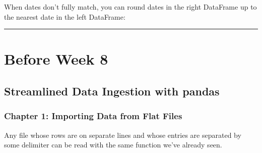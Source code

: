 \documentclass[letterpaper,10pt,english]{sphinxmanual}
\begin{document}
\begin{sphinxVerbatim}[commandchars=\\\{\}]
      
             
     
    
            
\end{sphinxVerbatim}

When dates don’t fully match, you can round dates in the right DataFrame up to the nearest date in the left DataFrame:

\begin{sphinxVerbatim}[commandchars=\\\{\}]
     
\end{sphinxVerbatim}


\bigskip\hrule\bigskip



\section{Before Week 8}
\label{\detokenize{big-cheat-sheet:before-week-8}}

\subsection{Streamlined Data Ingestion with pandas}
\label{\detokenize{big-cheat-sheet:streamlined-data-ingestion-with-pandas}}

\subsubsection{Chapter 1: Importing Data from Flat Files}
\label{\detokenize{big-cheat-sheet:chapter-1-importing-data-from-flat-files}}
Any file whose rows are on separate lines and whose entries are separated by some delimiter can be read with the same  function we’ve already seen.
\end{document}
